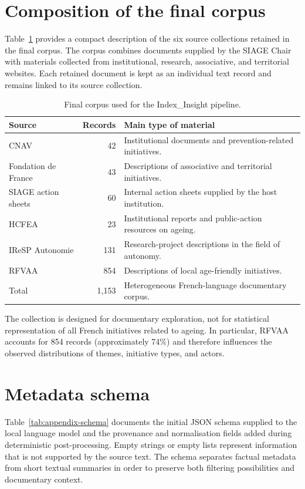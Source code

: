 \documentclass[
11pt,
english,
singlespacing,
headsepline,
]{MastersDoctoralThesis}
\begin{document}
\section{Composition of the final corpus}

Table~\ref{tab:appendix-corpus-sources} provides a compact description of the
six source collections retained in the final corpus. The corpus combines
documents supplied by the SIAGE Chair with materials collected from institutional,
research, associative, and territorial websites. Each retained document is kept
as an individual text record and remains linked to its source collection.

\begin{table}[H]
\centering
\begin{tabular}{lrp{8cm}}
\toprule
Source & Records & Main type of material \\
\midrule
CNAV & 42 & Institutional documents and prevention-related initiatives. \\
Fondation de France & 43 & Descriptions of associative and territorial initiatives. \\
SIAGE action sheets & 60 & Internal action sheets supplied by the host institution. \\
HCFEA & 23 & Institutional reports and public-action resources on ageing. \\
IReSP Autonomie & 131 & Research-project descriptions in the field of autonomy. \\
RFVAA & 854 & Descriptions of local age-friendly initiatives. \\
\midrule
Total & 1,153 & Heterogeneous French-language documentary corpus. \\
\bottomrule
\end{tabular}
\caption{Final corpus used for the Index\_Insight pipeline.}
\label{tab:appendix-corpus-sources}
\end{table}

The collection is designed for documentary exploration, not for statistical
representation of all French initiatives related to ageing. In particular, RFVAA
accounts for 854 records (approximately 74\%) and therefore influences the
observed distributions of themes, initiative types, and actors.

\section{Metadata schema}

Table~\ref{tab:appendix-schema} documents the initial JSON schema supplied to
the local language model and the provenance and normalisation fields added
during deterministic post-processing. Empty strings or empty lists represent
information that is not supported by the source text. The schema separates
factual metadata from short textual summaries in order to preserve both
filtering possibilities and documentary context.
\end{document}

